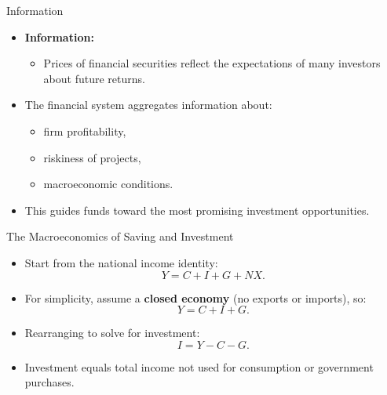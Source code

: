 \documentclass[aspectratio=169]{beamer}
\begin{document}
\begin{frame}{Information}
\transfade
\begin{itemize}[<+->]
  \item \textbf{Information:}
  \begin{itemize}[<+->]
    \item Prices of financial securities reflect the expectations of many investors about future returns.
  \end{itemize}
  \item The financial system aggregates information about:
  \begin{itemize}[<+->]
    \item firm profitability,
    \item riskiness of projects,
    \item macroeconomic conditions.
  \end{itemize}
  \item This guides funds toward the most promising investment opportunities.
\end{itemize}
\end{frame}


\begin{frame}{The Macroeconomics of Saving and Investment}
\transfade
\begin{itemize}[<+->]
  \item Start from the national income identity:
  \[
    Y = C + I + G + NX.
  \]
  \item For simplicity, assume a \textbf{closed economy} (no exports or imports), so:
  \[
    Y = C + I + G.
  \]
  \item Rearranging to solve for investment:
  \[
    I = Y - C - G.
  \]
  \item Investment equals total income not used for consumption or government purchases.
\end{itemize}
\end{frame}
\end{document}
